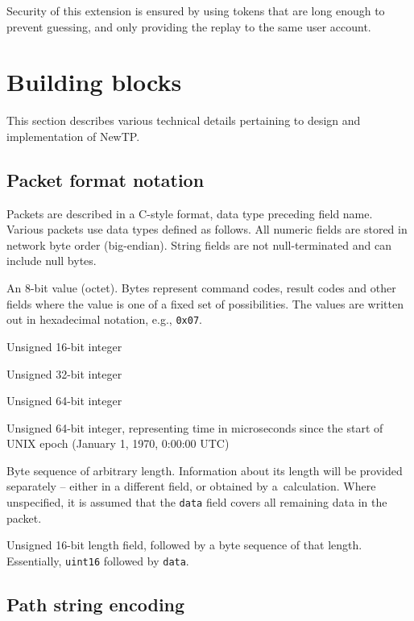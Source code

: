 Security of this extension is ensured by using tokens that are long enough to prevent guessing, and only
providing the replay to the same user account.


\section{Building blocks}

This section describes various technical details pertaining to design and implementation of NewTP.

%

\subsection{Packet format notation}

Packets are described in a C-style format, data type preceding field name. Various packets use data types
defined as follows. All numeric fields are stored in network byte order (big-endian). String fields are not
null-terminated and can include null bytes.

\def\ttitem#1{ \item[\ttfamily #1] }
\begin{description}[leftmargin=1.7cm,style=sameline]
	\ttitem{byte} An 8-bit value (octet). Bytes represent command codes, result codes and other fields
		where the value is one of a fixed set of possibilities. The values are written out in
		hexadecimal notation, e.g., {\tt 0x07}.
	\ttitem{uint16} Unsigned 16-bit integer
	\ttitem{uint32} Unsigned 32-bit integer
	\ttitem{uint64} Unsigned 64-bit integer
	\ttitem{time\_t} Unsigned 64-bit integer, representing time in microseconds since the start of UNIX
		epoch (January 1, 1970, 0:00:00 UTC)
	\ttitem{data} Byte sequence of arbitrary length. Information about its length will be provided
		separately -- either in a different field, or obtained by a~calculation. Where unspecified, it
		is assumed that the {\tt data} field covers all remaining data in the packet.
	\ttitem{string} Unsigned 16-bit length field, followed by a byte sequence of that length. Essentially,
		{\tt uint16} followed by {\tt data}.
\end{description}

%

\subsection{Path string encoding}

